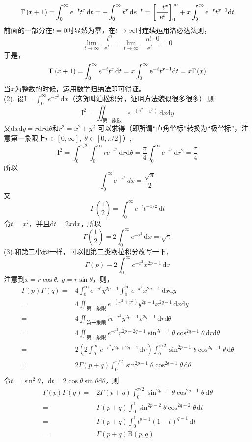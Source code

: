 \documentclass[11pt,a4paper,openany]{article}
\begin{document}
\[
\Gamma\left(x+1\right)=
\int^{\infty}_{0}e^{-t}t^{x}\,\mathrm{d}t
=-\int^{\infty}_{0}t^{x}\,\mathrm{d}e^{-t}
=\left[\frac{-t^x}{\mathrm{e}^t}\right]_0^\infty + x \int_0^\infty \mathrm{e}^{-t} t ^{x - 1} {\rm{d}} t
\]
前面的一部分在$t=0$时显然为零，在$t\rightarrow \infty$时连续运用洛必达法则，
\[
\lim_{t \rightarrow \infty} \frac{-t^n}{\mathrm{e}^t} = \lim_{t \rightarrow \infty} \frac{-n! \cdot 0}{\mathrm{e}^t} = 0
\]
于是，
\[
\Gamma\left(x+1\right)=
\int^{\infty}_{0}e^{-t}t^{x}\,\mathrm{d}t
=x \int_0^\infty \mathrm{e}^{-t} t ^{x - 1} {\rm{d}} t
=x\Gamma\left(x\right)
\]
当$x$为整数的时候，运用数学归纳法即可得证。\\
(2).
设$\text{I}=\int_0^{\infty } e^{-x^2} \, \mathrm{d}x$（这货叫泊松积分，证明方法貌似很多很多）,则
$$\text{I}^2=\iint_{\text{第一象限}} e^{-(x^2+y^2)} \,\mathrm{d}x\mathrm{d}y$$
又$\mathrm{d}x\mathrm{d}y=r\mathrm{d}r\mathrm{d}\theta$和$r^2=x^2+y^2$
可以求得（即所谓“直角坐标”转换为“极坐标”，注意第一象限上$r\in[0,\infty]$,\ $\theta\in[0,\pi/2]$）,
$$
\text{I}^2
=\int^{\pi/2}_0 \int^{\infty}_0 r e^{-r^2} \,\mathrm{d}r\mathrm{d}\theta
=\frac{\pi}{4} \int^{\infty}_0 e^{-r^2} \,\mathrm{d}r^2=\frac{\pi}{4} 
$$
所以
$$\int_0^{\infty } e^{-x^2} \, dx=\frac{\sqrt{\pi}}{2}$$
又
\[
\Gamma\left(\frac{1}{2}\right)=
\int^{\infty}_{0}e^{-t}t^{-1/2}\,\mathrm{d}t
\]
令$t=x^2$，并且$\mathrm{d}t=2x\mathrm{d}x$，所以
\[
\Gamma\left(\frac{1}{2}\right)=
2\int^{\infty}_{0}e^{-x^2}\,\mathrm{d}x=\sqrt{\pi}
\]
(3).和第二小题一样，可以把第二类欧拉积分改写一下，
\[
\Gamma\left(p\right)=
2\int^{\infty}_{0}e^{-x^2}x^{2p-1}\,\mathrm{d}x
\]
注意到$x=r\cos\theta,\ y=r\sin\theta$，则，
\[
\begin{split}
\Gamma\left(p\right)\Gamma\left(q\right)=&
4\int^{\infty}_{0}e^{-y^2}y^{2p-1}\int^{\infty}_{0}e^{-x^2}x^{2q-1}\,\mathrm{d}x\mathrm{d}y \\
=& 4\iint_{\text{第一象限}} e^{-(x^2+y^2)}y^{2p-1}x^{2q-1}\,\mathrm{d}x\mathrm{d}y\\
=& 4\iint_{\text{第一象限}} re^{-r^2}y^{2p-1}x^{2q-1}\,\mathrm{d}r\mathrm{d}\theta\\
=& 4\iint_{\text{第一象限}} e^{-r^2}r^{2p+2q-1}\sin^{2p-1}\theta\cos^{2q-1}\theta \,\mathrm{d}r\mathrm{d}\theta\\
=& 2\left(2\int_{0}^{\infty} e^{-r^2}r^{2p+2q-1}\,\mathrm{d}r\right)\int_{0}^{\pi/2}\sin^{2p-1}\theta\cos^{2q-1}\theta \,\mathrm{d}\theta\\
=& 2\Gamma\left(p+q\right)\int_{0}^{\pi/2}\sin^{2p-1}\theta\cos^{2q-1}\theta \,\mathrm{d}\theta\\
\end{split}
\]
令$t=\sin^2\theta$，$\mathrm{d}t=2\cos\theta\sin\theta\mathrm{d}\theta$，则
\[
\begin{split}
\Gamma\left(p\right)\Gamma\left(q\right)
=& 2\Gamma\left(p+q\right)\int_{0}^{\pi/2}\sin^{2p-1}\theta\cos^{2q-1}\theta \,\mathrm{d}\theta\\
=& \Gamma\left(p+q\right)
\int_{0}^{1}\sin^{2p-2}\theta\cos^{2q-2}\theta \,\mathrm{d}t\\
=& \Gamma\left(p+q\right)
\int_{0}^{1}t^{p-1}(1-t)^{q-1}\,\mathrm{d}t\\
=& \Gamma\left(p+q\right) \mathrm{B}(p,q)
\end{split}
\]
\end{document}
